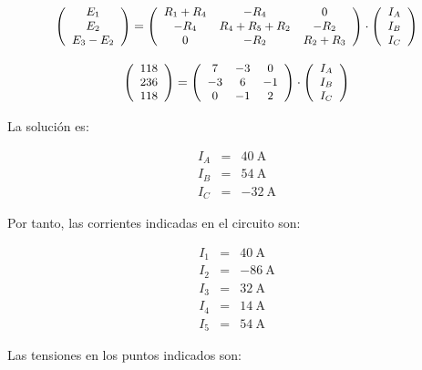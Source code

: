 \documentclass[10pt]{article}
\begin{document}
\[
\small{
\left(\begin{array}{c}
    E_1\\
    E_2\\
    E_3 - E_2
  \end{array}\right) = \left(\begin{array}{ccc}
    R_1 + R_4 & -R_4 & 0\\
    -R_4 & R_4 + R_5 + R_2 & -R_{2}\\
    0 & -R_2 & R_2 + R_3
  \end{array}\right) \cdot \left(\begin{array}{c}
    I_{A}\\
    I_{B}\\
    I_{C}
  \end{array}\right)
}
\]

\[
\small{
\left(\begin{array}{c}
    118\\
    236\\
    118
  \end{array}\right) = \left(\begin{array}{ccc}
    7 & -3 & 0\\
    -3 & 6 & -1\\
    0 & -1 & 2
  \end{array}\right) \cdot \left(\begin{array}{c}
    I_{A}\\
    I_{B}\\
    I_{C}
  \end{array}\right)
}
\]

La solución es:

\begin{eqnarray*}
I_A & = & \SI{40}{\ampere}\\
I_B & = & \SI{54}{\ampere}\\
I_C & = & -\SI{32}{\ampere}
\end{eqnarray*}

Por tanto, las corrientes indicadas en el circuito son:

\begin{eqnarray*}
I_1 & = & \SI{40}{\ampere}\\
I_2 & = & \SI{-86}{\ampere}\\
I_3 & = &  \SI{32}{\ampere}\\
I_4 & = &  \SI{14}{\ampere}\\
I_5 & = &  \SI{54}{\ampere}
\end{eqnarray*}

Las tensiones en los puntos indicados son:
\end{document}
